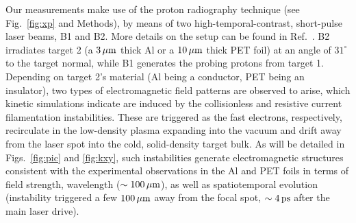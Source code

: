 \documentclass[aps,twocolumn,showpacs,superscriptaddress]{revtex4}
\begin{document}
Our measurements make use of the proton radiography technique (see Fig.~\ref{fig:xp} and Methods), by means of two high-temporal-contrast, short-pulse laser beams, B1 and B2. More details on the setup can be found in Ref.~\cite{RSI_Albertazzi_2015}.
B2 irradiates target 2 (a $3\,\rm \mu m$ thick Al or a $10\,\rm \mu m$ thick PET foil) at an angle of $31^\circ$ to the target normal, while B1 generates the probing protons from target 1. Depending on target 2's material (Al being a conductor, PET being an insulator), two types of electromagnetic field patterns are observed to arise, which kinetic simulations indicate are induced by the collisionless and resistive current filamentation instabilities. These are triggered as the fast electrons, respectively, recirculate in the low-density plasma expanding into the vacuum and drift away from the laser spot into the cold, solid-density target bulk. As will be detailed in Figs.~\ref{fig:pic} and \ref{fig:kxy}, such instabilities generate electromagnetic structures consistent with the experimental observations in the Al and PET foils in terms of field strength, wavelength ($\sim 100\,\rm \mu m$), as well as spatiotemporal evolution (instability triggered a few $100\,\rm \mu m$ away from the focal spot, $\sim 4\,\rm ps$ after the main laser drive).
%
\end{document}
